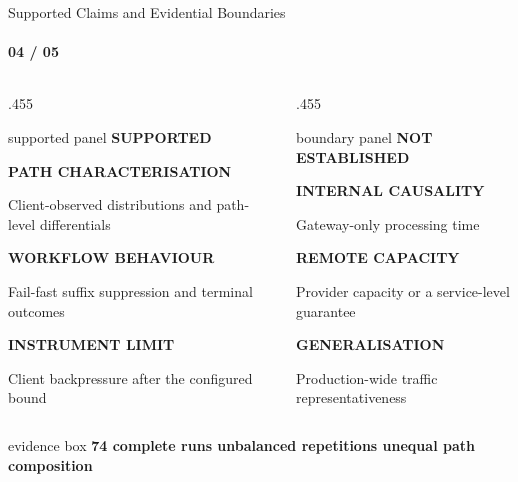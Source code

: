 \documentclass[aspectratio=43]{beamer}
\newcommand{\sectionprogress}[1]{\framesubtitle{#1 / 05}}
\begin{document}
\begin{frame}{Supported Claims and Evidential Boundaries}
  \sectionprogress{04}
  \begin{columns}[T,onlytextwidth]
    \begin{column}{.455\textwidth}
      \begin{beamercolorbox}[wd=\linewidth,sep=.8ex,rounded=true]{supported panel}
        {\normalsize\bfseries\color{accentTeal}SUPPORTED}\par
        \vspace{.3em}
        {\scriptsize\bfseries\color{accentTeal}PATH CHARACTERISATION}\par
        {\footnotesize Client-observed distributions and path-level differentials}\par
        \vspace{.4em}
        {\scriptsize\bfseries\color{accentTeal}WORKFLOW BEHAVIOUR}\par
        {\footnotesize Fail-fast suffix suppression and terminal outcomes}\par
        \vspace{.4em}
        {\scriptsize\bfseries\color{accentTeal}INSTRUMENT LIMIT}\par
        {\footnotesize Client backpressure after the configured bound}\par
      \end{beamercolorbox}
    \end{column}
    \begin{column}{.455\textwidth}
      \begin{beamercolorbox}[wd=\linewidth,sep=.8ex,rounded=true]{boundary panel}
        {\normalsize\bfseries\color{unipdRed}NOT ESTABLISHED}\par
        \vspace{.3em}
        {\scriptsize\bfseries\color{unipdRed}INTERNAL CAUSALITY}\par
        {\footnotesize Gateway-only processing time}\par
        \vspace{.4em}
        {\scriptsize\bfseries\color{unipdRed}REMOTE CAPACITY}\par
        {\footnotesize Provider capacity or a service-level guarantee}\par
        \vspace{.4em}
        {\scriptsize\bfseries\color{unipdRed}GENERALISATION}\par
        {\footnotesize Production-wide traffic representativeness}\par
      \end{beamercolorbox}
    \end{column}
  \end{columns}
  \vspace{.4em}
  \centering
  \begin{beamercolorbox}[wd=.94\textwidth,sep=.45ex,rounded=true,center]{evidence box}
    {\scriptsize\bfseries\color{inkGray}74 complete runs \quad unbalanced repetitions \quad unequal path composition}
  \end{beamercolorbox}
\end{frame}
\end{document}
